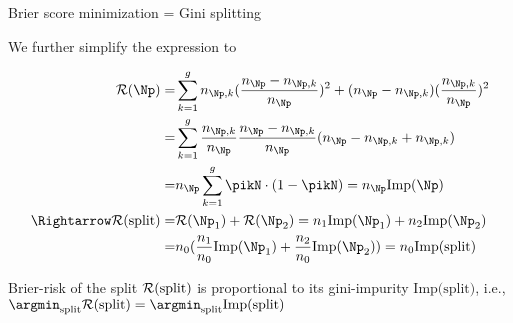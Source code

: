 \documentclass[11pt,compress,t,notes=noshow, xcolor=table]{beamer}
\begin{document}
\begin{frame2}[small]{Brier score minimization = Gini splitting}

We further simplify the expression to

\begin{align*}
\risk(\Np) =&  \sum_{k = 1}^g n_{\Np,k}(\frac{n_{\Np } - n_{\Np,k}}{n_{\Np }})^2 + (n_{\Np } - n_{\Np,k})(\frac{n_{\Np,k}}{n_{\Np }})^2 \\
=& \sum_{k = 1}^g \frac{n_{\Np,k}}{n_{\Np }} \frac{n_{\Np } - n_{\Np,k}}{n_{\Np }} (n_{\Np } - n_{\Np,k } + n_{\Np,k}) \\
=& n_{\Np } \sum_{k = 1}^g \pikN \cdot (1 - \pikN ) = n_\Np \text{Imp}(\Np)\\
\Rightarrow \risk(\text{split}) =& \risk(\Np_1) + \risk(\Np_2)  = n_1 \text{Imp}(\Np_1) + n_2 \text{Imp}(\Np_2)\\
=&n_0 (\frac{n_1}{n_0} \text{Imp}(\Np_1) + \frac{n_2}{n_0} \text{Imp}(\Np_2)) = n_0\text{Imp(split)}\\
\end{align*} 

Brier-risk of the split $\mathcal{R}(\text{split})$ is proportional to its gini-impurity $\text{Imp(split)}$, i.e., $\argmin_\text{split} \risk(\text{split}) = \argmin_\text{split} \text{Imp(split)}$\\

\end{frame2}


\endlecture
\end{document}
